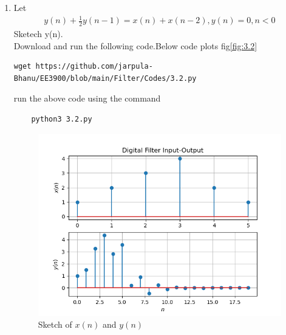 \documentclass[journal,12pt,twocolumn]{IEEEtran}
\renewcommand\thesection{\arabic{section}}
\begin{document}
\begin{enumerate}[label=\thesection.\arabic*
,ref=\thesection.\theenumi]
\item Let
	\begin{align}\label{3.2}
		y(n) + \frac{1}{2}y(n-1) = x(n)+x(n-2),
		y(n)=0,n<0
	\end{align}
Sketech y(n).\\
\solution Download and run the following code.Below code plots fig\eqref{fig:3.2}
\begin{lstlisting}
wget https://github.com/jarpula-Bhanu/EE3900/blob/main/Filter/Codes/3.2.py
\end{lstlisting}
run the above code using the command
\begin{lstlisting}
	python3 3.2.py
\end{lstlisting}
\begin{figure}[h]
    \centering
    \includegraphics[width=\columnwidth]{./figs/3.2.png}
    \caption{Sketch of $x(n)$ and $y(n)$}
    \label{fig:3.2}
\end{figure}


\end{enumerate}
\end{document}
